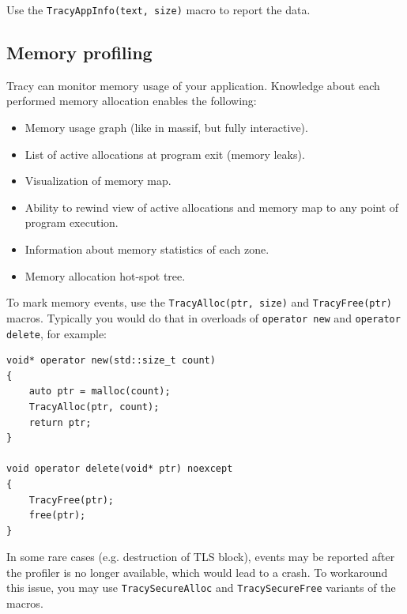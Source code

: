 \documentclass[hidelinks,titlepage,a4paper]{article}
\begin{document}
Use the \texttt{TracyAppInfo(text, size)} macro to report the data.

\subsection{Memory profiling}
\label{memoryprofiling}

Tracy can monitor memory usage of your application. Knowledge about each performed memory allocation enables the following:

\begin{itemize}
\item Memory usage graph (like in massif, but fully interactive).
\item List of active allocations at program exit (memory leaks).
\item Visualization of memory map.
\item Ability to rewind view of active allocations and memory map to any point of program execution.
\item Information about memory statistics of each zone.
\item Memory allocation hot-spot tree.
\end{itemize}

To mark memory events, use the \texttt{TracyAlloc(ptr, size)} and \texttt{TracyFree(ptr)} macros. Typically you would do that in overloads of \texttt{operator new} and \texttt{operator delete}, for example:

\begin{lstlisting}
void* operator new(std::size_t count)
{
    auto ptr = malloc(count);
    TracyAlloc(ptr, count);
    return ptr;
}

void operator delete(void* ptr) noexcept
{
    TracyFree(ptr);
    free(ptr);
}
\end{lstlisting}

In some rare cases (e.g. destruction of TLS block), events may be reported after the profiler is no longer available, which would lead to a crash. To workaround this issue, you may use \texttt{TracySecureAlloc} and \texttt{TracySecureFree} variants of the macros.
\end{document}
